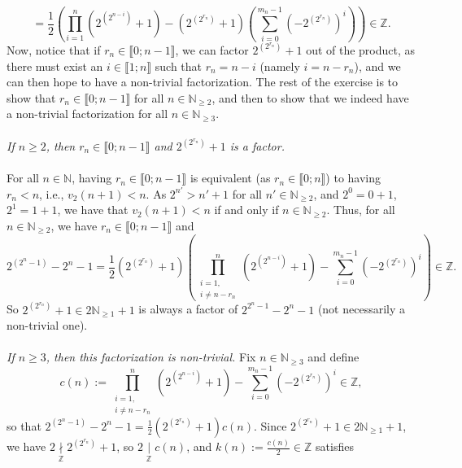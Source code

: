 \begin{solution}
\[    \]
    \[
        = \frac{1}{2}\left(\prod_{i=1}^{n} \left(2^{\left(2^{n-i}\right)}+1\right)-\left(2^{\left(2^{r_n}\right)}+1\right)\left(\sum_{i=0}^{m_n-1} \left(-2^{\left(2^{r_n}\right)}\right)^i\right)\right) \in \mathbb{Z}.
    \]
    Now, notice that if \( r_n \in \llbracket 0;n-1 \rrbracket \), we can factor \( 2^{\left(2^{r_n}\right)}+1 \) out of the product, as there must exist an \( i \in \llbracket 1;n \rrbracket \) such that \( r_n = n-i \) (namely \( i = n - r_n \)), and we can then hope to have a non-trivial factorization. The rest of the exercise is to show that \( r_n \in \llbracket 0;n-1 \rrbracket \) for all \( n \in \mathbb{N}_{\geq 2} \), and then to show that we indeed have a non-trivial factorization for all \( n \in \mathbb{N}_{\geq 3} \).
    \\\\
    \textit{If \( n \geq 2 \), then \( r_n \in \llbracket 0;n-1 \rrbracket \) and \( 2^{\left(2^{r_n}\right)}+1 \) is a factor.}
    \\\\
    For all \( n \in \mathbb{N} \), having \( r_n \in \llbracket 0;n-1 \rrbracket \) is equivalent (as \( r_n \in \llbracket 0;n \rrbracket \)) to having \( r_n < n \), i.e., \( v_2\left(n+1\right) < n \). As \( 2^{n'} > n'+1 \) for all \( n' \in \mathbb{N}_{\geq 2} \), and \( 2^0 = 0+1 \), \( 2^1 = 1+1 \), we have that \( v_2\left(n+1\right) < n \) if and only if \( n \in \mathbb{N}_{\geq 2} \). Thus, for all \( n \in \mathbb{N}_{\geq 2} \), we have \( r_n \in \llbracket 0;n-1 \rrbracket \) and
    \[
        2^{\left(2^n-1\right)}-2^n-1 = \frac{1}{2}\left(2^{\left(2^{r_n}\right)}+1\right)\left(\prod_{\substack{i=1,\\ i \neq n-r_n}}^{n} \left(2^{\left(2^{n-i}\right)}+1\right)-\sum_{i=0}^{m_n-1} \left(-2^{\left(2^{r_n}\right)}\right)^i\right) \in \mathbb{Z}.
    \]
    So \( 2^{\left(2^{r_n}\right)}+1 \in 2\mathbb{N}_{\geq 1}+1 \) is always a factor of \( 2^{2^n-1}-2^n-1 \) (not necessarily a non-trivial one).
    \\\\
    \textit{If \( n \geq 3 \), then this factorization is non-trivial.}
    Fix \( n \in \mathbb{N}_{\geq 3} \) and define
    \[
        c\left(n\right) := \prod_{\substack{i=1,\\ i \neq n-r_n}}^{n} \left(2^{\left(2^{n-i}\right)}+1\right)-\sum_{i=0}^{m_n-1} \left(-2^{\left(2^{r_n}\right)}\right)^i \in \mathbb{Z},
    \]
    so that \( 2^{\left(2^n-1\right)}-2^n-1 = \frac{1}{2}\left(2^{\left(2^{r_n}\right)}+1\right)c\left(n\right) \). Since \( 2^{\left(2^{r_n}\right)}+1 \in 2\mathbb{N}_{\geq 1}+1 \), we have \( 2 \underset{\mathbb{Z}}{\nmid} 2^{\left(2^{r_n}\right)}+1 \), so \( 2 \underset{\mathbb{Z}}{\mid} c\left(n\right) \), and \( k\left(n\right) := \frac{c\left(n\right)}{2} \in \mathbb{Z} \) satisfies

\end{solution}
